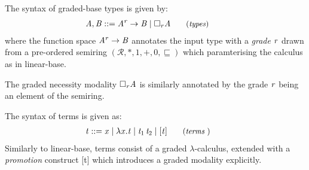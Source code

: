 The syntax of graded-base types is given by:
\begin{align*}
\hspace{-0.9em}\GRANULEnt{A} , \GRANULEnt{B} & ::=
       \GRANULEnt{A} ^ \GRANULEnt{r}  \rightarrow  \GRANULEnt{B}
  \mid \Box_{  \GRANULEnt{r}  }  \GRANULEnt{A}
{\small{\tag{\textit{types}}}}
\end{align*}
where the function space $\mathit{A} ^ {\mathit{r}}  \rightarrow  \mathit{B}$ annotates the input type with a \emph{grade} $\mathit{r}$
drawn from a pre-ordered semiring
$(\mathcal{R}, {\ast}, {1}, {+}, {0}, \sqsubseteq)$ which paramterising the
calculus as in linear-base.

The graded necessity modality $\Box_{  \mathit{r}  }  \mathit{A}$ is similarly annotated by the grade
$\mathit{r}$ being an element of the semiring.


The syntax of terms is given as:
%
\begin{align*}
\hspace{-0.8em} \GRANULEnt{t} ::= \;
       & \GRANULEmv{x}
  \mid \lambda  \GRANULEmv{x}  .  \GRANULEnt{t}
  \mid \GRANULEnt{t_{{\mathrm{1}}}} \, \GRANULEnt{t_{{\mathrm{2}}}}
  \mid \GRANULEsym{[}  \GRANULEnt{t}  \GRANULEsym{]}
{\small{\tag{\textit{terms} }}}
\end{align*}
%
Similarly to linear-base, terms consist of a graded $\lambda$-calculus, extended
with a \textit{promotion} construct [t] which introduces a graded modality
explicitly.


